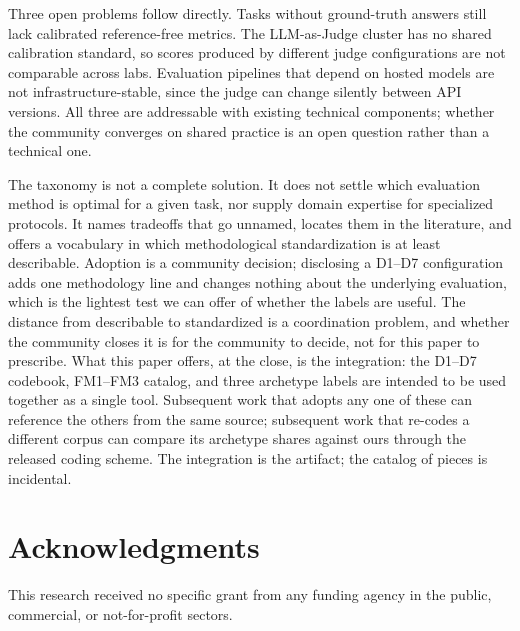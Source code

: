 \documentclass[acmsmall, nonacm, screen]{acmart}
\begin{document}
Three open problems follow directly. Tasks without ground-truth
answers still lack calibrated reference-free metrics. The LLM-as-Judge
cluster has no shared calibration standard, so scores produced by
different judge configurations are not comparable across labs.
Evaluation pipelines that depend on hosted models are not
infrastructure-stable, since the judge can change silently between
API versions. All three are addressable with existing technical
components; whether the community converges on shared practice is an
open question rather than a technical one.

The taxonomy is not a complete solution. It does not settle which
evaluation method is optimal for a given task, nor supply domain
expertise for specialized protocols. It names tradeoffs that go
unnamed, locates them in the literature, and offers a vocabulary in
which methodological standardization is at least describable.
Adoption is a community decision; disclosing a D1--D7 configuration
adds one methodology line and changes nothing about the underlying
evaluation, which is the lightest test we can offer of whether the
labels are useful.
The distance from describable to standardized is a coordination
problem, and whether the community closes it is for the community to
decide, not for this paper to prescribe. What this paper offers, at
the close, is the integration: the D1--D7 codebook, FM1--FM3
catalog, and three archetype labels are intended to be used together
as a single tool. Subsequent work that adopts any one of these can
reference the others from the same source; subsequent work that
re-codes a different corpus can compare its archetype shares against
ours through the released coding scheme. The integration is the
artifact; the catalog of pieces is incidental.

\FloatBarrier
\section*{Acknowledgments}
This research received no specific grant from any funding agency in
the public, commercial, or not-for-profit sectors.
\end{document}
